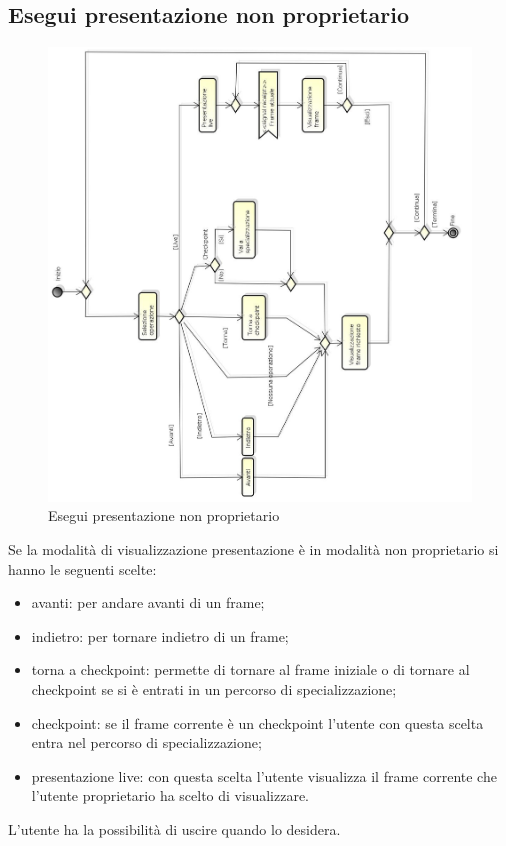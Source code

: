 \newpage

\subsection{Esegui presentazione non proprietario}

\begin{figure}[h!]
		\centering
		\includegraphics[scale=.4]{img/attivita/Esegui_presentazione_non_proprietario.jpg}
		\caption{Esegui presentazione non proprietario}		\label{fig:Esegui_presentazione_non_proprietario}
\end{figure}

Se la modalità di visualizzazione presentazione è in modalità non proprietario si hanno le seguenti scelte: 
\begin{itemize}
\item
avanti: per andare avanti di un frame; 
\item 
indietro: per tornare indietro di un frame;
\item torna a checkpoint: permette di tornare al frame iniziale o di tornare al checkpoint se si è entrati in un percorso di specializzazione; 
\item checkpoint: se il frame corrente è un checkpoint l'utente con questa scelta entra nel percorso di specializzazione;
\item presentazione live: con questa scelta l'utente visualizza il frame corrente che l'utente proprietario ha scelto di visualizzare.
\end{itemize}
L'utente ha la possibilità di uscire quando lo desidera.


